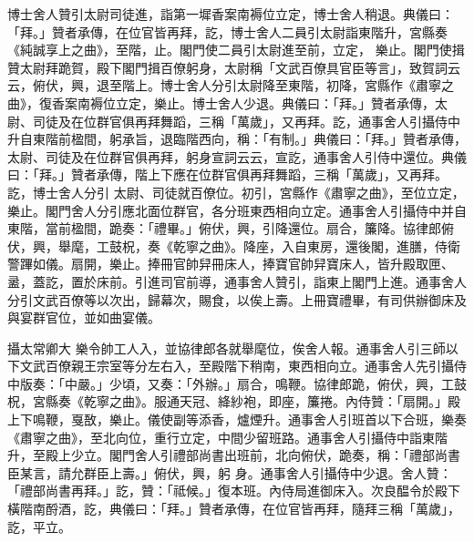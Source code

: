\begin{pinyinscope}
 博士舍人贊引太尉司徒進，詣第一墀香案南褥位立定，博士舍人稍退。典儀曰：「拜。」贊者承傳，在位官皆再拜，訖，博士舍人二員引太尉詣東階升，宮縣奏《純誠享上之曲》，至階，止。閣門使二員引太尉進至前，立定，
 樂止。閣門使揖贊太尉拜跪賀，殿下閣門揖百僚躬身，太尉稱「文武百僚具官臣等言」，致賀詞云云，俯伏，興，退至階上。博士舍人分引太尉降至東階，初降，宮縣作《肅寧之曲》，復香案南褥位立定，樂止。博士舍人少退。典儀曰：「拜。」贊者承傳，太尉、司徒及在位群官俱再拜舞蹈，三稱「萬歲」，又再拜。訖，通事舍人引攝侍中升自東階前楹間，躬承旨，退臨階西向，稱：「有制。」典儀曰：「拜。」贊者承傳，太尉、司徒及在位群官俱再拜，躬身宣詞云云，宣訖，通事舍人引侍中還位。典儀曰：「拜。」贊者承傳，階上下應在位群官俱再拜舞蹈，三稱「萬歲」，又再拜。訖，博士舍人分引
 太尉、司徒就百僚位。初引，宮縣作《肅寧之曲》，至位立定，樂止。閣門舍人分引應北面位群官，各分班東西相向立定。通事舍人引攝侍中并自東階，當前楹間，跪奏：「禮畢。」俯伏，興，引降還位。扇合，簾降。協律郎俯伏，興，舉麾，工鼓柷，奏《乾寧之曲》。降座，入自東房，還後閣，進膳，侍衛警蹕如儀。扇開，樂止。捧冊官帥舁冊床人，捧寶官帥舁寶床人，皆升殿取匣、盝，蓋訖，置於床前。引進司官前導，通事舍人贊引，詣東上閣門上進。通事舍人分引文武百僚等以次出，歸幕次，賜食，以俟上壽。上冊寶禮畢，有司供辦御床及與宴群官位，並如曲宴儀。



 攝太常卿大
 樂令帥工人入，並協律郎各就舉麾位，俟舍人報。通事舍人引三師以下文武百僚親王宗室等分左右入，至殿階下稍南，東西相向立。通事舍人先引攝侍中版奏：「中嚴。」少頃，又奏：「外辦。」扇合，鳴鞭。協律郎跪，俯伏，興，工鼓柷，宮縣奏《乾寧之曲》。服通天冠、絳紗袍，即座，簾捲。內侍贊：「扇開。」殿上下鳴鞭，戛敔，樂止。儀使副等添香，爐煙升。通事舍人引班首以下合班，樂奏《肅寧之曲》，至北向位，重行立定，中間少留班路。通事舍人引攝侍中詣東階升，至殿上少立。閣門舍人引禮部尚書出班前，北向俯伏，跪奏，稱：「禮部尚書臣某言，請允群臣上壽。」俯伏，興，躬
 身。通事舍人引攝侍中少退。舍人贊：「禮部尚書再拜。」訖，贊：「祗候。」復本班。內侍局進御床入。次良醖令於殿下橫階南酹酒，訖，典儀曰：「拜。」贊者承傳，在位官皆再拜，隨拜三稱「萬歲」，訖，平立。




\end{pinyinscope}
